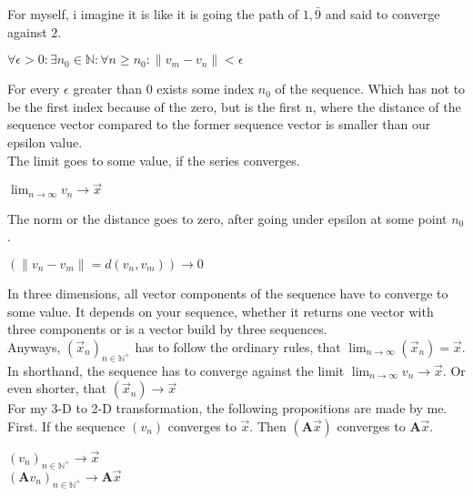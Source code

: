 \documentclass[a4paper]{article}
\begin{document}
For myself, i imagine it is like it is going the path of $1,\bar{9}$ and said to converge against $2$.\\

\begin{center}
$\forall \epsilon > 0 : \exists n_{0} \in \mathbb{N} : \forall n \geq n_{0} : \|v_{m}-v_{n}\| < \epsilon$
\end{center}

For every $\epsilon$ greater than 0 exists some index $n_{0}$ of the sequence. Which has not to be the first index because of the zero,
but is the first n, where the distance of the sequence vector compared to the former sequence vector is smaller than our epsilon value.\\

The limit goes to some value, if the series converges.\\

\begin{center}
$\lim\nolimits_{n\rightarrow\infty} v_{n} \rightarrow \vec{x}$\\
\end{center}

The norm or the distance goes to zero, after going under epsilon at some point $n_{0}$.

\begin{center}
$(\|v_{n}-v_{m}\| = d(v_{n},v_{m})) \rightarrow 0$
\end{center}


In three dimensions, all vector components of the sequence have to converge to some value. It depends on your sequence, whether it returns one vector with three components or is a vector build by three sequences.\\

 Anyways, $(\vec{x}_{n})_{n \in \mathbb{N}^{+} }$ has to follow the ordinary rules, that $\lim_{n\rightarrow\infty}(\vec{x}_{n}) = \vec{x}$. In shorthand, the sequence has to converge against the limit $\lim_{n\rightarrow\infty}v_{n}\rightarrow\vec{x}$. Or even shorter, that $(\vec{x}_{n}) \rightarrow \vec{x}$\\

For my 3-D to 2-D transformation, the following propositions are made by me.\\

First. If the sequence $(v_{n})$ converges to $\vec{x}$. Then $(\boldsymbol{A}\vec{x})$ converges to $\boldsymbol{A}\vec{x}$.\\

\begin{center}
$(v_{n})_{n\in\mathbb{N}^{+}} \rightarrow \vec{x}$\\
$(\boldsymbol{A}v_{n})_{n\in\mathbb{N}^{+}} \rightarrow \boldsymbol{A}\vec{x}$
\end{center}
\end{document}

